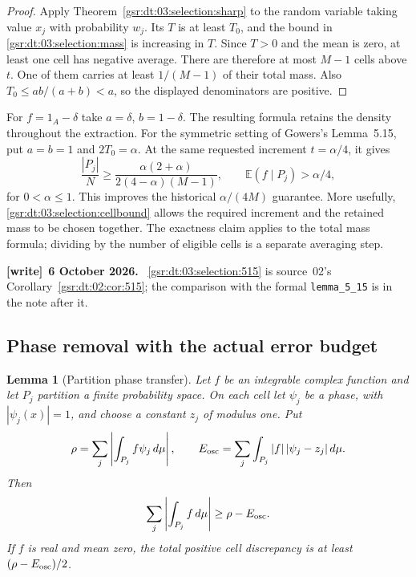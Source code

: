 \documentclass[11pt,letterpaper]{article}
\numberwithin{equation}{section}
\newtheorem{lemma}[theorem]{Lemma}
\theoremstyle{definition}
\theoremstyle{remark}
\newcommand{\E}{\mathbb E}
\newcommand{\1}{\mathbf 1}
\newcommand{\file}[1]{\nolinkurl{#1}}
\newenvironment{writenote}[1][]{\par\smallskip\begingroup\small
 \noindent\textbf{[write]}\if\relax\detokenize{#1}\relax\else~\textbf{#1.}\fi\ }%
 {\par\endgroup\smallskip}
\begin{document}
\begin{proof}
Apply Theorem~\ref{gsr:dt:03:selection:sharp} to the random variable taking value
$x_j$ with probability $w_j$. Its $T$ is at least $T_0$, and the bound in
\eqref{gsr:dt:03:selection:mass} is increasing in $T$. Since $T>0$ and the mean is
zero, at least one cell has negative average. There are therefore at most
$M-1$ cells above $t$. One of them carries at least $1/(M-1)$ of their
total mass. Also $T_0\le ab/(a+b)<a$, so the displayed denominators are
positive.
\end{proof}

For $f=1_A-\delta$ take $a=\delta$, $b=1-\delta$. The resulting formula
retains the density throughout the extraction. For the symmetric setting
of Gowers's Lemma~5.15, put $a=b=1$ and $2T_0=\alpha$.
At the same requested increment $t=\alpha/4$, it gives
\begin{equation}
 \frac{|P_j|}{N}\ge
 \frac{\alpha(2+\alpha)}{2(4-\alpha)(M-1)},
 \qquad \E(f\mid P_j)>\alpha/4,
 \label{gsr:dt:03:selection:515}
\end{equation}
for $0<\alpha\le1$. This improves the historical
$\alpha/(4M)$ guarantee. More usefully, \eqref{gsr:dt:03:selection:cellbound} allows
the required increment and the retained mass to be chosen together.
The exactness claim applies to the total mass formula; dividing by the
number of eligible cells is a separate averaging step.
\begin{writenote}[6 October 2026]
\eqref{gsr:dt:03:selection:515} is source~02's Corollary~\ref{gsr:dt:02:cor:515}; the comparison with the formal \file{lemma_5_15} is in the note after it.
\end{writenote}

\subsection{Phase removal with the actual error budget}

\begin{lemma}[Partition phase transfer]
\label{gsr:dt:03:selection:phase}
Let $f$ be an integrable complex function and let $P_j$ partition a finite
probability space. On each cell let $\psi_j$ be a phase, with
$|\psi_j(x)|=1$, and choose a constant $z_j$ of modulus one. Put
\[
 \rho=\sum_j\left|\int_{P_j}f\psi_j\,d\mu\right|,
 \qquad
 E_{\rm osc}=\sum_j\int_{P_j}|f|\,|\psi_j-z_j|\,d\mu.
\]
Then
\begin{equation}
 \sum_j\left|\int_{P_j}f\,d\mu\right|
       \ge \rho-E_{\rm osc}.
 \label{gsr:dt:03:selection:transfer}
\end{equation}
If $f$ is real and mean zero, the total positive cell discrepancy is at
least $(\rho-E_{\rm osc})/2$.
\end{lemma}
\end{document}

